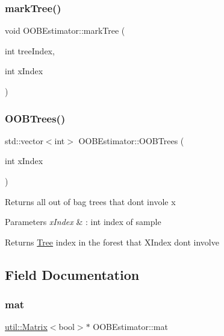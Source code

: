 \subsubsection{\texorpdfstring{mark\+Tree()}{markTree()}}
{\footnotesize\ttfamily void O\+O\+B\+Estimator\+::mark\+Tree (\begin{DoxyParamCaption}\item[{int}]{tree\+Index,  }\item[{int}]{x\+Index }\end{DoxyParamCaption})\hspace{0.3cm}{\ttfamily [inline]}}

\mbox{\label{structOOBEstimator_a562eaa254b4d88129369ca3a33cd03f2}} 
\subsubsection{\texorpdfstring{O\+O\+B\+Trees()}{OOBTrees()}}
{\footnotesize\ttfamily std\+::vector$<$int$>$ O\+O\+B\+Estimator\+::\+O\+O\+B\+Trees (\begin{DoxyParamCaption}\item[{int}]{x\+Index }\end{DoxyParamCaption})\hspace{0.3cm}{\ttfamily [inline]}}

Returns all out of bag trees that don\textquotesingle{}t invole x 
\begin{DoxyParams}{Parameters}
{\em x\+Index} & \+: int index of sample \\
\hline
\end{DoxyParams}
\begin{DoxyReturn}{Returns}
\hyperlink{classTree}{Tree} index in the forest that X\+Index don\textquotesingle{}t involve 
\end{DoxyReturn}


\subsection{Field Documentation}
\mbox{\label{structOOBEstimator_adff3279f68eba078d403e2673aa6627e}} 
\subsubsection{\texorpdfstring{mat}{mat}}
{\footnotesize\ttfamily \hyperlink{classutil_1_1Matrix}{util\+::\+Matrix}$<$bool$>$$\ast$ O\+O\+B\+Estimator\+::mat}

